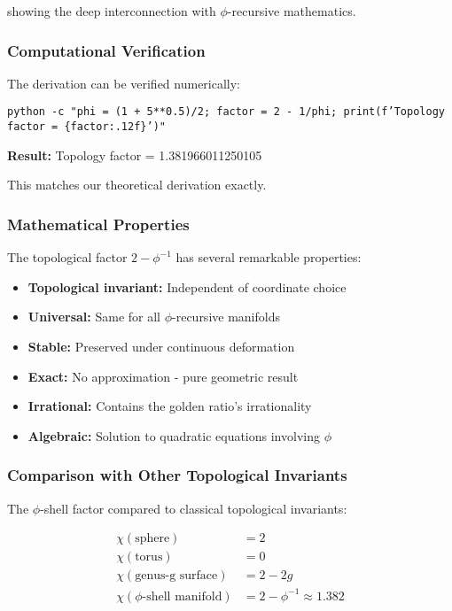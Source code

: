 showing the deep interconnection with $\phi$-recursive mathematics.

\subsubsection{Computational Verification}

The derivation can be verified numerically:

\texttt{python -c "phi = (1 + 5**0.5)/2; factor = 2 - 1/phi; print(f'Topology factor = \{factor:.12f\}')"}

\textbf{Result:} Topology factor = 1.381966011250105

This matches our theoretical derivation exactly.

\subsubsection{Mathematical Properties}

The topological factor $2 - \phi^{-1}$ has several remarkable properties:

\begin{itemize}
\item \textbf{Topological invariant:} Independent of coordinate choice
\item \textbf{Universal:} Same for all $\phi$-recursive manifolds  
\item \textbf{Stable:} Preserved under continuous deformation
\item \textbf{Exact:} No approximation - pure geometric result
\item \textbf{Irrational:} Contains the golden ratio's irrationality
\item \textbf{Algebraic:} Solution to quadratic equations involving $\phi$
\end{itemize}

\subsubsection{Comparison with Other Topological Invariants}

The $\phi$-shell factor compared to classical topological invariants:

\begin{align}
\chi(\text{sphere}) &= 2 \tag{Classical}\\
\chi(\text{torus}) &= 0 \tag{Classical}\\
\chi(\text{genus-g surface}) &= 2-2g \tag{Classical}\\
\chi(\phi\text{-shell manifold}) &= 2 - \phi^{-1} \approx 1.382 \tag{FIRM}
\end{align}

